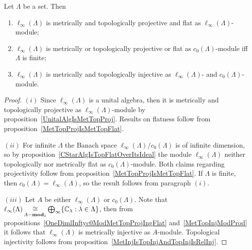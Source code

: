 \begin{proposition}\label{c0AndlInftyModlIfty} Let $\Lambda$ be a set. Then

\begin{enumerate}[label = (\roman*)]
    \item $\ell_\infty(\Lambda)$ is metrically and topologically projective 
    and flat as $\ell_\infty(\Lambda)$-module;

    \item $\ell_\infty(\Lambda)$ is metrically or topologically projective 
    or flat as $c_0(\Lambda)$-module iff $\Lambda$ is finite;

    \item $\ell_\infty(\Lambda)$ is metrically and topologically injective as
    $\ell_\infty(\Lambda)$- and $c_0(\Lambda)$-module.
\end{enumerate}
\end{proposition}
\begin{proof} $(i)$ Since $\ell_\infty(\Lambda)$ is a unital algebra, then it is
metrically and topologically projective as $\ell_\infty(\Lambda)$-module by
proposition~\ref{UnitalAlgIsMetTopProj}. Results on flatness follow from
proposition~\ref{MetTopProjIsMetTopFlat}.

$(ii)$ For infinite $\Lambda$ the Banach space
$\ell_\infty(\Lambda)/c_0(\Lambda)$ is of infinite dimension, so by
proposition~\ref{CStarAlgIsTopFlatOverItsIdeal} the module
$\ell_\infty(\Lambda)$ neither topologically nor metrically flat as
$c_0(\Lambda)$-module. Both claims regarding projectivity follow from
proposition~\ref{MetTopProjIsMetTopFlat}. If $\Lambda$ is finite, then
$c_0(\Lambda)=\ell_\infty(\Lambda)$, so the result follows from paragraph $(i)$.

$(iii)$ Let $A$ be either $\ell_\infty(\Lambda)$ or $c_0(\Lambda)$. Note that
$\ell_\infty(\Lambda)
\mathop{\mathbin{\cong}}\limits_{A-\mathbf{mod}_1}
\bigoplus_\infty \{\mathbb{C}_\lambda:\lambda\in\Lambda \}$, then from
propositions~\ref{OneDimlInftyc0ModMetTopProjIngFlat} and~\ref{MetTopInjModProd}
it follows that $\ell_\infty(\Lambda)$ is metrically injective as $A$-module.
Topological injectivity follows from
proposition~\ref{MetInjIsTopInjAndTopInjIsRelInj}.
\end{proof}

